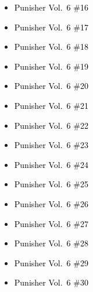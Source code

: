 \documentclass[12pt]{article}
\newcommand{\checkbox}{\raisebox{0.0ex}{\fbox{\rule{0ex}{1.5ex} \rule{1.5ex}{0ex}}}}
\begin{document}
\vspace{0.3cm}
\noindent
\begin{tcolorbox}[
  colback=white!95!gray,
  colframe=black,
  width=\textwidth,
  arc=4mm,
  auto outer arc,
  boxrule=0.8pt,
  left=8pt,right=8pt,top=8pt,bottom=8pt
]
\begin{itemize}[left=0pt,label={\checkbox}]
    \item \textcolor{black}{Punisher Vol.\ 6 \#16}
    \item \textcolor{black}{Punisher Vol.\ 6 \#17}
    \item \textcolor{black}{Punisher Vol.\ 6 \#18}
    \item \textcolor{black}{Punisher Vol.\ 6 \#19}
    \item \textcolor{black}{Punisher Vol.\ 6 \#20}
    \item \textcolor{black}{Punisher Vol.\ 6 \#21}
    \item \textcolor{black}{Punisher Vol.\ 6 \#22}
    \item \textcolor{black}{Punisher Vol.\ 6 \#23}
    \item \textcolor{black}{Punisher Vol.\ 6 \#24}
    \item \textcolor{black}{Punisher Vol.\ 6 \#25}
    \item \textcolor{black}{Punisher Vol.\ 6 \#26}
    \item \textcolor{black}{Punisher Vol.\ 6 \#27}
    \item \textcolor{black}{Punisher Vol.\ 6 \#28}
    \item \textcolor{black}{Punisher Vol.\ 6 \#29}
    \item \textcolor{black}{Punisher Vol.\ 6 \#30}
\end{itemize}
\end{tcolorbox}

\newpage
{}
\end{document}
